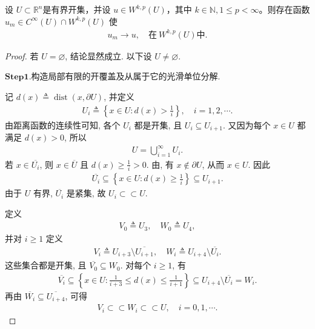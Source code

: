 \documentclass[../../main.tex]{subfiles}
\begin{document}
\begin{theorem}[光滑函数的整体逼近定理]\label{theorem:ch05-光滑函数的整体逼近定理}
设 $U\subset \mathbb{R}^n$是有界开集，并设 $u\in W^{k,p}(U)$，其中 $k\in \mathbb{N},1\leqslant p<\infty$。则存在函数 $u_{m}\in C^{\infty}(U)\cap W^{k,p}(U)$ 使
\begin{align*}
u_{m}\to u,\quad\text{在}\ W^{k,p}(U)\text{中}.
\end{align*}
\end{theorem}
\begin{proof}
若 $U=\varnothing$, 结论显然成立. 以下设 $U\neq\varnothing$.

\noindent$\mathbf{Step}\mathbf{1}.${\heiti 构造局部有限的开覆盖及从属于它的光滑单位分解.}

记 $d(x)\triangleq\operatorname{dist}(x,\partial U)$, 并定义
\begin{align*}
U_i\triangleq\left\{x\in U:d(x)>\frac{1}{i}\right\},
\quad i=1,2,\cdots.
\end{align*}
由距离函数的连续性可知, 各个 $U_i$ 都是开集, 且 $U_i\subseteq U_{i+1}$. 又因为每个 $x\in U$ 都满足 $d(x)>0$, 所以
\begin{align}
U=\bigcup\limits_{i=1}^{\infty}U_i.
\label{eqLLLLLLLLPMMMMMOJOOKMQQQAAA}
\end{align}
若 $x\in\overline{U_i}$, 则 $x\in\overline{U}$ 且 $d(x)\geqslant\frac{1}{i}>0$.
由, 有 $x\notin\partial U$, 从而 $x\in U$. 因此
\begin{align*}
\overline{U_i}
\subseteq\left\{x\in U:d(x)\geqslant\frac{1}{i}\right\}
\subseteq U_{i+1}.
\end{align*}
由于 $U$ 有界, $\overline{U_i}$ 是紧集, 故 $U_i\subset \subset U$.

定义
\begin{align*}
V_0\triangleq U_3,\quad W_0\triangleq U_4,
\end{align*}
并对 $i\geqslant1$ 定义
\begin{align*}
V_i\triangleq U_{i+3}\setminus\overline{U_{i+1}},
\quad
W_i\triangleq U_{i+4}\setminus\overline{U_i}.
\end{align*}
这些集合都是开集, 且 $\overline{V_0}\subseteq W_0$. 对每个 $i\geqslant1$, 有
\begin{align*}
\overline{V_i}
\subseteq
\left\{x\in U:
\frac{1}{i+3}\leqslant d(x)\leqslant\frac{1}{i+1}\right\}
\subseteq U_{i+4}\setminus\overline{U_i}
=W_i.
\end{align*}
再由 $\overline{W_i}\subseteq\overline{U_{i+4}}$, 可得
\begin{align*}
V_i\subset \subset W_i\subset \subset U,\quad i=0,1,\cdots.
\end{align*}


\end{proof}
\end{document}
